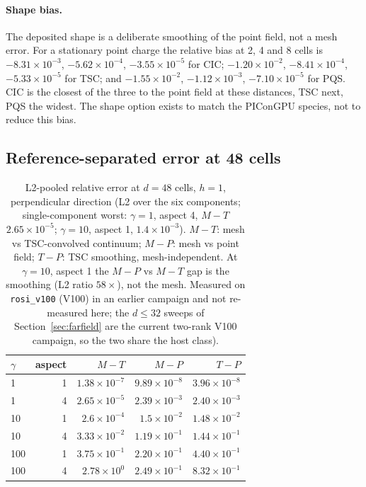 \paragraph{Shape bias.}
The deposited shape is a deliberate smoothing of the point field, not a mesh
error.  For a stationary point charge the relative bias at 2, 4 and 8 cells is
$-8.31\times10^{-3}$, $-5.62\times10^{-4}$, $-3.55\times10^{-5}$ for CIC;
$-1.20\times10^{-2}$, $-8.41\times10^{-4}$, $-5.33\times10^{-5}$ for TSC; and
$-1.55\times10^{-2}$, $-1.12\times10^{-3}$, $-7.10\times10^{-5}$ for PQS.
CIC is the closest of the three to the point field at these distances,
TSC next, PQS the widest.  The
shape option exists to match the PIConGPU species, not to reduce this bias.

\subsection{Reference-separated error at 48 cells}

\begin{table}[t]
\centering
\small
\caption{L2-pooled relative error at $d=48$ cells, $h=1$, perpendicular
direction (L2 over the six components; single-component worst:
$\gamma=1$, aspect 4, $M\!-\!T$ $2.65\times10^{-5}$; $\gamma=10$, aspect 1,
$1.4\times10^{-3}$). $M\!-\!T$: mesh vs TSC-convolved continuum;
$M\!-\!P$: mesh vs point field; $T\!-\!P$: TSC smoothing, mesh-independent.
At $\gamma=10$, aspect 1 the $M\!-\!P$ vs $M\!-\!T$ gap is the smoothing
(L2 ratio $58\times$), not the mesh. Measured on \texttt{rosi\_v100}
(V100) in an earlier campaign and not re-measured here; the $d\le32$ sweeps
of Section~\ref{sec:farfield} are the current two-rank V100 campaign, so the
two share the host class).}
\label{tab:d48}
\begin{tabular}{lrrrr}
\toprule
$\gamma$ & aspect & $M\!-\!T$ & $M\!-\!P$ & $T\!-\!P$ \\
\midrule
1   & 1 & $1.38\times10^{-7}$ & $9.89\times10^{-8}$ & $3.96\times10^{-8}$ \\
1   & 4 & $2.65\times10^{-5}$  & $2.39\times10^{-3}$  & $2.40\times10^{-3}$  \\
10  & 1 & $2.6\times10^{-4}$    & $1.5\times10^{-2}$   & $1.48\times10^{-2}$  \\
10  & 4 & $3.33\times10^{-2}$  & $1.19\times10^{-1}$  & $1.44\times10^{-1}$  \\
100 & 1 & $3.75\times10^{-1}$  & $2.20\times10^{-1}$  & $4.40\times10^{-1}$  \\
100 & 4 & $2.78\times10^{0}$   & $2.49\times10^{-1}$  & $8.32\times10^{-1}$  \\
\bottomrule
\end{tabular}
\end{table}

